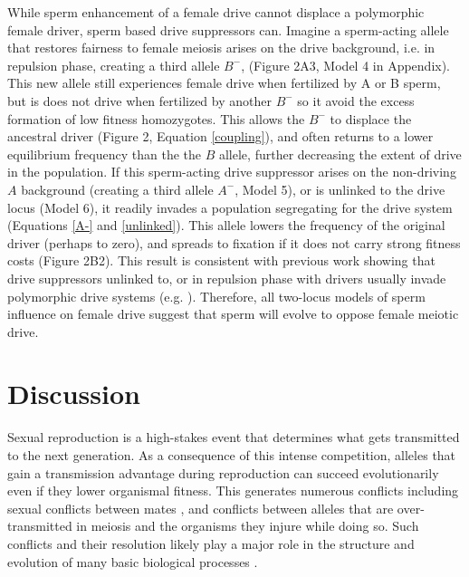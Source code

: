 \documentclass{pnastwo}
\begin{document}
\begin{article}
While  sperm enhancement of a female drive cannot displace a polymorphic female driver, sperm based drive suppressors can. 
Imagine a sperm-acting allele that restores fairness to female meiosis arises on
	the drive background, i.e. in repulsion phase, creating a
        third allele $B^{-}$, (Figure 2A3, Model 4 in Appendix). 
 This new allele still
        experiences female drive when fertilized by A or B sperm, but 
       is does not drive when fertilized by another $B^{-}$ so it
       avoid the excess formation of low fitness homozygotes. This
     allows the $B^{-}$ to displace the ancestral driver (Figure
     2, Equation \ref{coupling}), 
	and often returns to a lower equilibrium frequency than the the $B$ allele, further decreasing the extent of drive in the population.  
If this sperm-acting drive suppressor arises on 
	the non-driving $A$ background (creating a third allele $A^{-}$, Model 5), 
	or is unlinked to the drive locus (Model 6), it readily invades a population segregating
	for the drive system (Equations \ref{A-} and \ref{unlinked}).  
This allele lowers the frequency of the original driver (perhaps to zero),
	and spreads to fixation if it does not carry strong fitness costs
	(Figure 2B2). 
This result is consistent with previous work showing that drive suppressors unlinked to, or in repulsion phase with drivers usually invade polymorphic drive systems (e.g. \cite{Brandvain2012}).  
Therefore, all two-locus models of sperm influence on female drive suggest that
	sperm will evolve to oppose female meiotic drive.	
	


\section*{Discussion}

Sexual reproduction is a high-stakes event that determines what gets transmitted to the next generation.  
As a consequence of this intense competition, alleles that gain a transmission advantage during reproduction 
	can succeed evolutionarily even if they lower organismal fitness. 
This generates numerous conflicts  \cite{Burt2006} including sexual conflicts between mates \cite{Arnqvist2005}, 
	and conflicts between alleles that are over-transmitted in meiosis and the organisms they injure while doing so. 
Such conflicts and their resolution likely play a major role in the structure and evolution of many basic biological processes \cite{Rice2013}.


\end{article}
\end{document}
